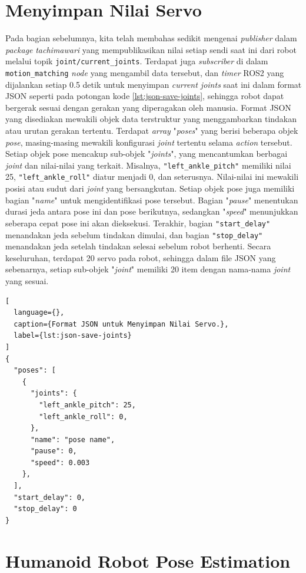 \section{Menyimpan Nilai Servo}
\label{sec:save-servo-value}

Pada bagian sebelumnya, kita telah membahas sedikit mengenai \emph{publisher} dalam \textit{package} \emph{tachimawari} yang mempublikasikan nilai setiap sendi saat ini dari robot melalui topik \verb|joint/current_joints|.
Terdapat juga \emph{subscriber} di dalam \verb|motion_matching| \textit{node} yang mengambil data tersebut, dan \textit{timer} ROS2 yang dijalankan setiap 0.5 detik untuk menyimpan \emph{current joints} saat ini dalam format JSON seperti pada potongan kode \ref{lst:json-save-joints}, sehingga robot dapat bergerak sesuai dengan gerakan yang diperagakan oleh manusia.
Format JSON yang disediakan mewakili objek data terstruktur yang menggambarkan tindakan atau urutan gerakan tertentu. Terdapat \textit{array} "\textit{poses}" yang berisi beberapa objek \textit{pose}, masing-masing mewakili konfigurasi \emph{joint} tertentu selama \textit{action} tersebut.
Setiap objek pose mencakup sub-objek "\textit{joints}", yang mencantumkan berbagai \emph{joint} dan nilai-nilai yang terkait. Misalnya, \verb|"left_ankle_pitch"| memiliki nilai 25, \verb|"left_ankle_roll"| diatur menjadi 0, dan seterusnya. Nilai-nilai ini mewakili posisi atau sudut dari \emph{joint} yang bersangkutan.
Setiap objek pose juga memiliki bagian "\textit{name}" untuk mengidentifikasi pose tersebut. Bagian "\textit{pause}" menentukan durasi jeda antara pose ini dan pose berikutnya, sedangkan "\textit{speed}" menunjukkan seberapa cepat pose ini akan dieksekusi.
Terakhir, bagian \verb|"start_delay"| menandakan jeda sebelum tindakan dimulai, dan bagian \verb|"stop_delay"| menandakan jeda setelah tindakan selesai sebelum robot berhenti. Secara keseluruhan, terdapat 20 servo pada robot, sehingga dalam file JSON yang sebenarnya, setiap sub-objek "\textit{joint}" memiliki 20 item dengan nama-nama \emph{joint} yang sesuai.
\begin{lstlisting}[
  language={},
  caption={Format JSON untuk Menyimpan Nilai Servo.},
  label={lst:json-save-joints}
]
{
  "poses": [
    {
      "joints": {
        "left_ankle_pitch": 25,
        "left_ankle_roll": 0,
      },
      "name": "pose name",
      "pause": 0,
      "speed": 0.003
    },
  ],
  "start_delay": 0,
  "stop_delay": 0
}
\end{lstlisting}


\section{Humanoid Robot Pose Estimation}
\label{sec:humanoid-robot-pose-estimation}


